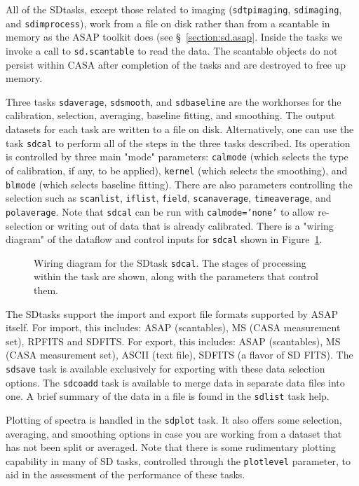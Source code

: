 All of the SDtasks, except  those related to imaging  ({\tt sdtpimaging}, {\tt sdimaging}, and {\tt sdimprocess}), work from a file on disk rather than from
a scantable in memory as the ASAP toolkit does (see 
\S~\ref{section:sd.asap}.  Inside the tasks we invoke a call
to {\tt sd.scantable} to read the data.  The scantable objects
do not persist within CASA after completion of the tasks and
are destroyed to free up memory. 

Three tasks {\tt sdaverage}, {\tt sdsmooth}, and {\tt sdbaseline} are the
workhorses for the calibration, selection,
averaging, baseline fitting, and smoothing. The output datasets for
each task are written to a file on disk.
Alternatively, one can use the task {\tt sdcal} to perform all of the steps in
the three tasks described. 
Its operation is
controlled by three main "mode" parameters: {\tt calmode} (which selects
the type of calibration, if any, to be applied), {\tt kernel} (which selects
the smoothing), and {\tt blmode} (which selects baseline fitting).  There
are also parameters controlling the selection such as {\tt scanlist}, 
{\tt iflist}, {\tt field}, {\tt scanaverage}, {\tt timeaverage}, and
{\tt polaverage}.  Note that {\tt sdcal} can be
run with {\tt calmode='none'} to allow re-selection or writing out of data
that is already calibrated.  There is a "wiring diagram" of the dataflow and control inputs for
{\tt sdcal} shown in Figure~\ref{fig:sdcal}.

\begin{figure}[h!]
\begin{center}
\caption{\label{fig:sdcal} Wiring diagram for the SDtask {\tt sdcal}.
The stages of processing within the task are shown, along with the
parameters that control them. }
\hrulefill
\end{center}
\end{figure}

The SDtasks support the import and export file formats supported
by ASAP itself.  For import, this includes:  ASAP (scantables), 
MS (CASA measurement set), RPFITS and SDFITS.  For export, this
includes: ASAP (scantables), MS (CASA measurement set),
ASCII (text file), SDFITS (a flavor of SD FITS).
The {\tt sdsave} task is available exclusively for exporting with these
data selection options.  The {\tt sdcoadd} task is available to merge data in separate data files
into one.  A brief summary of the data in a file is found in the {\tt sdlist}
task help.

Plotting of spectra is handled in the {\tt sdplot} task.  It also offers
some selection, averaging, and smoothing options in case you are
working from a dataset that has not been split or averaged.  Note that
there is some rudimentary plotting capability in many of SD 
tasks, controlled through the {\tt plotlevel} parameter, 
to aid in the assessment of the performance of these tasks.

